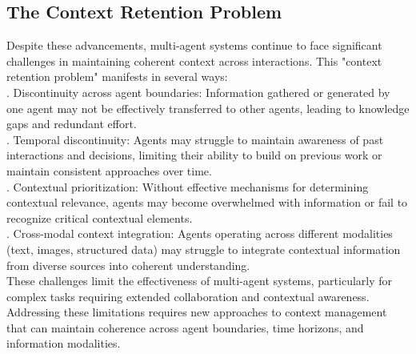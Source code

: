 \subsection{The Context Retention Problem}
Despite these advancements, multi-agent systems continue to face significant challenges in maintaining coherent context across interactions. This "context retention problem" manifests in several ways:\\ . Discontinuity across agent boundaries: Information gathered or generated by one agent may not be effectively transferred to other agents, leading to knowledge gaps and redundant effort.\\ . Temporal discontinuity: Agents may struggle to maintain awareness of past interactions and decisions, limiting their ability to build on previous work or maintain consistent approaches over time.\\ . Contextual prioritization: Without effective mechanisms for determining contextual relevance, agents may become overwhelmed with information or fail to recognize critical contextual elements.\\ . Cross-modal context integration: Agents operating across different modalities (text, images, structured data) may struggle to integrate contextual information from diverse sources into coherent understanding.\\ \newline
These challenges limit the effectiveness of multi-agent systems, particularly for complex tasks requiring extended collaboration and contextual awareness. Addressing these limitations requires new approaches to context management that can maintain coherence across agent boundaries, time horizons, and information modalities.\\
